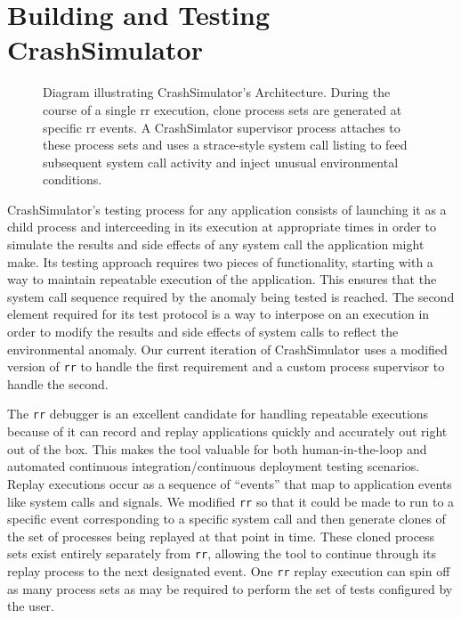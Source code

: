 \section{Building and Testing CrashSimulator}
\label{SEC:architecture}

\begin{figure}[t]
  \center{}
  \caption{Diagram illustrating CrashSimulator's Architecture.  During the
    course of a single rr execution, clone process sets are generated at
    specific rr events.  A CrashSimlator supervisor process attaches to
    these process sets and uses a strace-style system call listing to feed
    subsequent system call activity and inject unusual environmental
    conditions.}
  \label{figure:architecture}
\end{figure}

CrashSimulator's testing process for any application
consists of launching it as a child process and
interceeding in its execution at appropriate times in order to simulate the
results and side effects of any system call the application might make.
Its testing approach requires two pieces of
functionality, starting with a way to maintain
repeatable execution of the application.  This ensures that
the system call sequence required by the anomaly being tested is reached.
The second element required for its test protocol is a
way to interpose on an execution in order to modify the results and side
effects of system calls to reflect the environmental
anomaly.  Our current iteration of
CrashSimulator uses a modified version of {\tt rr} to handle the first
requirement and a custom process supervisor to handle the
second.

The {\tt rr} debugger is an excellent candidate
for handling repeatable executions
because of it can
record and replay applications quickly and accurately out right out of the
box.  This makes the tool valuable for both human-in-the-loop and automated
continuous integration/continuous deployment testing scenarios.  Replay
executions occur as a sequence of ``events'' that map to application
events like system calls and signals.  We modified {\tt rr} so that it
could be made to run to a specific event corresponding to a specific system
call and then generate clones of the set of processes being replayed at that
point in time.  These cloned process sets exist entirely separately from
{\tt rr}, allowing the tool to continue through
its replay process to the next
designated event.  One {\tt rr} replay execution can spin
off as many process sets as may be required to perform the set of tests
configured by the user.

